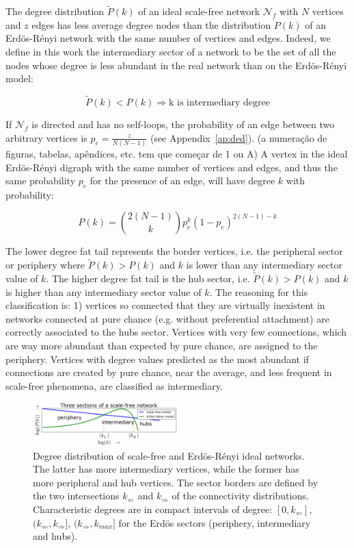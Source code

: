 \documentclass[%
 aip,
 jmp,%
 amsmath,amssymb,
 reprint,%
]{revtex4-1}
\begin{document}
The degree distribution $\widetilde{P}(k)$ of an ideal
scale-free network $\mathcal{N}_f$ with $N$ vertices and $z$ edges has less
average degree nodes than the distribution $P(k)$ of an Erd\"os-R\'enyi
network with the same number of vertices and edges. Indeed, we define in this work the intermediary sector of a network to be the set of all the nodes whose degree is less abundant in the real network than on the Erd\"os-R\'enyi model:

\begin{equation}\label{criterio}
    \widetilde{P}(k)<P(k) \Rightarrow \text{k is intermediary degree}
\end{equation}

If $\mathcal{N}_f$ is directed and has no self-loops, the probability
of an edge between two arbitrary vertices is $p_e=\frac{z}{N(N-1)}$ (see Appendix~\ref{ap:ded}). (a numeração de figuras, tabelas, apêndices, etc. tem que começar de 1 ou A)
A vertex in the ideal Erd\"os-R\'enyi digraph with the same number of vertices and edges, and thus the same probability $p_e$ for the presence of an edge, will have degree $k$ with probability:

\begin{equation}
    P(k)=\binom{2(N-1)}{k}p_e^k(1-p_e)^{2(N-1)-k}
\end{equation}

The lower degree fat tail represents the border vertices, i.e. the peripheral sector or periphery where $\widetilde{P}(k)>P(k)$ and $k$ is lower than any intermediary sector value of $k$. The higher degree fat tail is the hub sector, i.e. $\widetilde{P}(k)>P(k)$ and $k$ is higher than any intermediary sector value of $k$. The reasoning for this classification is: 1) vertices so connected that they are virtually inexistent in networks connected at pure chance (e.g. without preferential attachment) are correctly associated to the hubs sector. Vertices with very few connections, which are way more abundant than expected by pure chance, are assigned to the periphery. Vertices with degree values predicted as the most abundant if connections are created by pure chance, near the average, and less frequent in scale-free phenomena, are classified as intermediary.

\begin{figure}[!h]
    \centering
    \includegraphics[width=0.5\textwidth]{figs/fser_}
    \caption{Degree distribution of scale-free and Erd\"os-R\'enyi ideal networks. The latter has more
        intermediary vertices, while the former has more peripheral and hub vertices. The sector borders are defined by the two intersections $k_\Leftarrow$ and $k_\Rightarrow$ of the connectivity distributions. Characteristic degrees
    are in compact intervals of degree: $[0,k_\Leftarrow]$, $(k_\Leftarrow,k_\Rightarrow]$, $(k_\Rightarrow,k_{max}]$ for the Erd\"os sectors (periphery, intermediary and hubs).}
    \label{fig:setores}
\end{figure}
\end{document}
